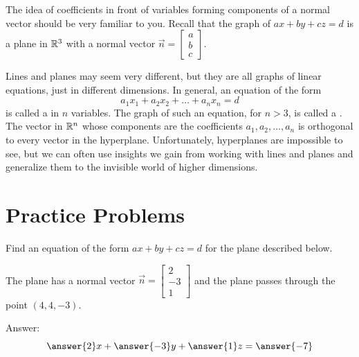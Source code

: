 \documentclass{ximera}
\begin{document}

\begin{onlineOnly}
\begin{center} 
\end{center}
\end{onlineOnly}

The idea of coefficients in front of variables forming components of a normal vector should be very familiar to you.  Recall that the graph of $ax+by+cz=d$ is a plane in $\mathbb{R}^3$ with a normal vector $\vec{n}=\begin{bmatrix}a\\b\\c\end{bmatrix}$.

Lines and planes may seem very different, but they are all graphs of linear equations, just in different dimensions.  In general, an equation of the form
$$a_1x_1+a_2x_2+\dots +a_nx_n=d$$
is called a  in $n$ variables.  The graph of such an equation, for $n>3$, is called a .  The vector in $\mathbb{R}^n$ whose components are the coefficients $a_1, a_2, \dots ,a_n$ is orthogonal to every vector in the hyperplane.  Unfortunately, hyperplanes are impossible to see, but we can often use insights we gain from working with lines and planes and generalize them to the invisible world of higher dimensions.


\section*{Practice Problems}

\begin{problem}\label{prob:eqplane1}  Find an equation of the form $ax+by+cz=d$ for the plane described below.
  
  The plane has a normal vector $\vec{n}=\begin{bmatrix}2\\-3\\1\end{bmatrix}$ and the plane passes through the point $(4, 4, -3)$.
  
  Answer: $$\answer{2}x+\answer{-3}y+\answer{1}z=\answer{-7}$$
  \end{problem}
  
\end{document}
